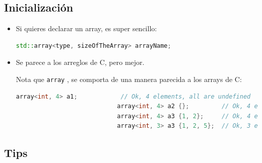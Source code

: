 \documentclass[12pt, fleqn]{report}                             %
\theoremstyle{break}                                            %
\newcommand{\textCode}[1]  { \texttt{#1} }                      %
\begin{document}
            \subsection{Inicialización}
                \begin{itemize}
                    \item Si quieres declarar un array, es super sencillo:
                        \begin{lstlisting}[language=C++, gobble=28]
                            std::array<type, sizeOfTheArray> arrayName;
                        \end{lstlisting}
                    
                    \item Se parece a los arreglos de C, pero mejor.
                        
                        Nota que \textCode{array}, se comporta de una manera parecida a los arrays de C:
                        \begin{lstlisting}[language=C++, gobble=28]
                            array<int, 4> a1;            // Ok, 4 elements, all are undefined
                            array<int, 4> a2 {};         // Ok, 4 elements: [0, 0, 0, 0]
                            array<int, 4> a3 {1, 2};     // Ok, 4 elements: [1, 2, 0, 0]
                            array<int, 3> a3 {1, 2, 5};  // Ok, 3 elements: [1, 2, 5]
                        \end{lstlisting}

                \end{itemize}

                
            \subsection{Tips}
\end{document}
